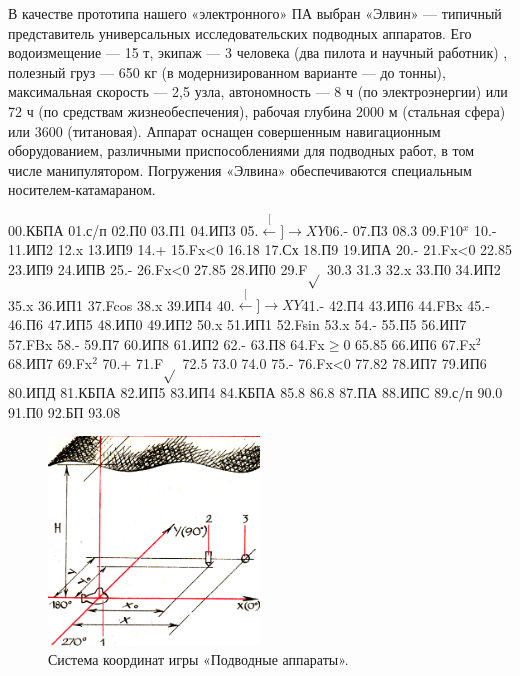 \documentclass[11pt,a4paper,oneside]{article}
\def\XY{$\stackrel[\leftarrow]{\rightarrow}{XY}$}
\begin{document}
В качестве прототипа нашего «электронного» ПА выбран «Элвин» — типичный представитель универсальных исследовательских подводных аппаратов. Его водоизмещение — 15 т, экипаж — 3 человека (два пилота и научный работник) , полезный груз — 650 кг (в модернизированном варианте — до тонны), максимальная скорость — 2,5 узла, автономность — 8 ч (по электроэнергии) или 72 ч (по средствам жизнеобеспечения), рабочая глубина 2000 м (стальная сфера) или 3600 (титановая). Аппарат оснащен совершенным навигационным оборудованием, различными приспособлениями для подводных работ, в том числе манипулятором. Погружения «Элвина» обеспечиваются специальным носителем-катамараном.

00.КБПА 01.с/п 02.П0 03.П1 04.ИП3 05.\XY 06.- 07.П3 08.3 09.F10$^{x}$ 10.- 11.ИП2 12.x 13.ИП9 14.+ 15.Fx<0 16.18 17.Сх 18.П9 19.ИПА 20.- 21.Fx<0 22.85 23.ИП9 24.ИПВ 25.- 26.Fx<0 27.85 28.ИП0 29.F$\sqrt{}$ 30.3 31.3
32.x 33.П0 34.ИП2 35.x 36.ИП1 37.Fcos 38.x 39.ИП4 40.\XY 41.- 42.П4 43.ИП6 44.FBx 45.- 46.П6 47.ИП5 48.ИП0 49.ИП2 50.x 51.ИП1 52.Fsin 53.x 54.- 55.П5
56.ИП7 57.FBx 58.- 59.П7 60.ИП8 61.ИП2 62.- 63.П8
64.Fx$\geq$0 65.85 66.ИП6 67.Fx$^{2}$ 68.ИП7 69.Fx$^{2}$ 70.+
71.F$\sqrt{}$ 72.5 73.0 74.0 75.- 76.Fx<0 77.82 78.ИП7
79.ИП6 80.ИПД 81.КБПА 82.ИП5 83.ИП4 84.КБПА 85.8 86.8 87.ПА 88.ИПС 89.с/п 90.0 91.П0 92.БП 93.08

\begin{figure}[H]
\includegraphics[width=0.5\textwidth]{submarine3}
\caption{Система координат игры «Подводные аппараты».}
\end{figure}
\end{document}
